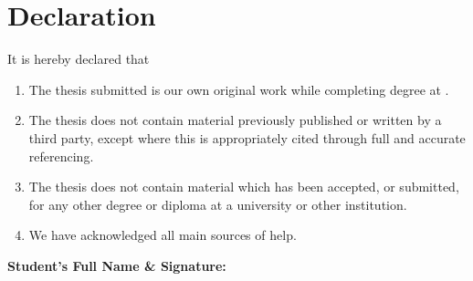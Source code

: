 \chapter*{Declaration}
It is hereby declared that
\begin{enumerate}
  \item The thesis submitted is our own original work while completing degree at \university.
  \item The thesis does not contain material previously published or written by a third party, except where this is appropriately cited through full and accurate referencing.
  \item The thesis does not contain material which has been accepted, or submitted, for any other degree or diploma at a university or other institution.
  \item We have acknowledged all main sources of help.
\end{enumerate}

\vspace{0.5cm}
\noindent\textbf{Student's Full Name \& Signature:}

\begin{center}
\signatureblock{\studentA}{\idA}{\sigA}\hfill
\signatureblock{\studentB}{\idB}{\sigB}

\signatureblock{\studentC}{\idC}{\sigC}
\end{center}
